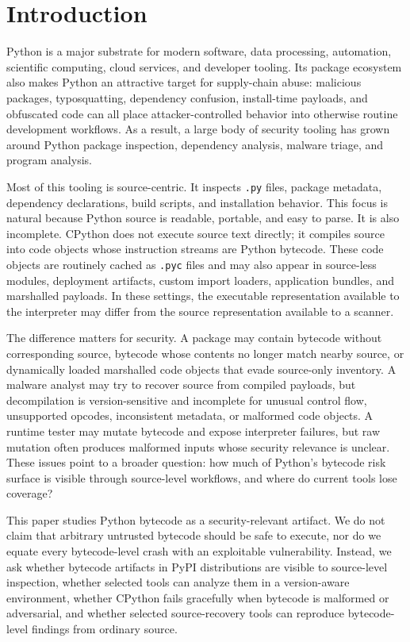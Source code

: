 \section{Introduction}\label{sec:intro}

Python is a major substrate for modern software, data processing, automation, scientific computing, cloud services, and developer tooling.  Its package ecosystem also makes Python an attractive target for supply-chain abuse: malicious packages, typosquatting, dependency confusion, install-time payloads, and obfuscated code can all place attacker-controlled behavior into otherwise routine development workflows.  As a result, a large body of security tooling has grown around Python package inspection, dependency analysis, malware triage, and program analysis.

Most of this tooling is source-centric.  It inspects \texttt{.py} files, package metadata, dependency declarations, build scripts, and installation behavior.  This focus is natural because Python source is readable, portable, and easy to parse.  It is also incomplete.  CPython does not execute source text directly; it compiles source into code objects whose instruction streams are Python bytecode.  These code objects are routinely cached as \texttt{.pyc} files and may also appear in source-less modules, deployment artifacts, custom import loaders, application bundles, and marshalled payloads.  In these settings, the executable representation available to the interpreter may differ from the source representation available to a scanner.

The difference matters for security.  A package may contain bytecode without corresponding source, bytecode whose contents no longer match nearby source, or dynamically loaded marshalled code objects that evade source-only inventory.  A malware analyst may try to recover source from compiled payloads, but decompilation is version-sensitive and incomplete for unusual control flow, unsupported opcodes, inconsistent metadata, or malformed code objects.  A runtime tester may mutate bytecode and expose interpreter failures, but raw mutation often produces malformed inputs whose security relevance is unclear.  These issues point to a broader question: how much of Python's bytecode risk surface is visible through source-level workflows, and where do current tools lose coverage?

This paper studies Python bytecode as a security-relevant artifact.  We do not claim that arbitrary untrusted bytecode should be safe to execute, nor do we equate every bytecode-level crash with an exploitable vulnerability.  Instead, we ask whether bytecode artifacts in PyPI distributions are visible to source-level inspection, whether selected tools can analyze them in a version-aware environment, whether CPython fails gracefully when bytecode is malformed or adversarial, and whether selected source-recovery tools can reproduce bytecode-level findings from ordinary source.

